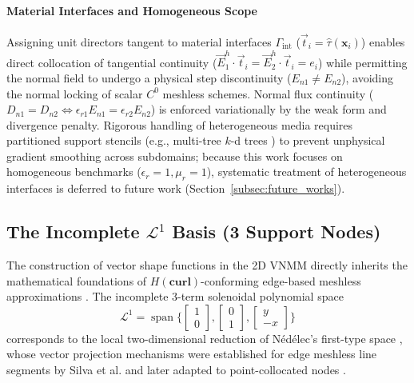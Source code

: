 \documentclass[preprint,12pt]{elsarticle}
\begin{document}
\paragraph{Material Interfaces and Homogeneous Scope}
Assigning unit directors tangent to material interfaces $\Gamma_{\text{int}}$ ($\vec{t}_i = \hat{\tau}(\mathbf{x}_i)$) enables direct collocation of tangential continuity ($\vec{E}^h_1 \cdot \vec{t}_i = \vec{E}^h_2 \cdot \vec{t}_i = e_i$) while permitting the normal field to undergo a physical step discontinuity ($E_{n1} \neq E_{n2}$), avoiding the normal locking of scalar $C^0$ meshless schemes. Normal flux continuity ($D_{n1} = D_{n2} \iff \epsilon_{r1} E_{n1} = \epsilon_{r2} E_{n2}$) is enforced variationally by the weak form and divergence penalty. Rigorous handling of heterogeneous media requires partitioned support stencils (e.g., multi-tree $k$-d trees \cite{parreira2006efficient}) to prevent unphysical gradient smoothing across subdomains; because this work focuses on homogeneous benchmarks ($\epsilon_r = 1, \mu_r = 1$), systematic treatment of heterogeneous interfaces is deferred to future work (Section~\ref{subsec:future_works}).

\subsection{The Incomplete \texorpdfstring{$\mathcal{L}^1$}{L1} Basis (3 Support Nodes)}
\label{subsec:incomplete_l1_basis}
The construction of vector shape functions in the 2D VNMM directly inherits the mathematical foundations of $H(\mathbf{curl})$-conforming edge-based meshless approximations \cite{lima2017edge, silva2018new}. The incomplete 3-term solenoidal polynomial space
\begin{equation}
    \mathcal{L}^1 = \operatorname{span}\{ \begin{bmatrix}1\\0\end{bmatrix}, \begin{bmatrix}0\\1\end{bmatrix}, \begin{bmatrix}y\\-x\end{bmatrix} \}
\end{equation}
corresponds to the local two-dimensional reduction of Nédélec's first-type space \cite{nedelec1980mixed}, whose vector projection mechanisms were established for edge meshless line segments by Silva et al. \cite{silva2018new} and later adapted to point-collocated nodes \cite{ortiz2021nodal, ortiz2023tese}.
\end{document}
